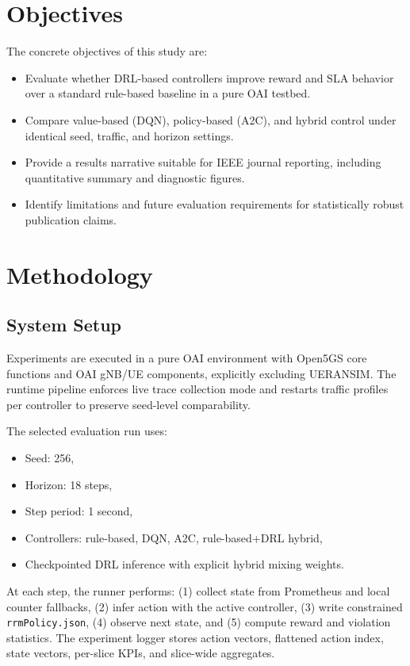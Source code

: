 \documentclass[journal]{IEEEtran}
\begin{document}
\section{Objectives}
The concrete objectives of this study are:
\begin{itemize}
    \item Evaluate whether DRL-based controllers improve reward and SLA behavior over a standard rule-based baseline in a pure OAI testbed.
    \item Compare value-based (DQN), policy-based (A2C), and hybrid control under identical seed, traffic, and horizon settings.
    \item Provide a results narrative suitable for IEEE journal reporting, including quantitative summary and diagnostic figures.
    \item Identify limitations and future evaluation requirements for statistically robust publication claims.
\end{itemize}

\section{Methodology}
\subsection{System Setup}
Experiments are executed in a pure OAI environment with Open5GS core functions and OAI gNB/UE components, explicitly excluding UERANSIM. The runtime pipeline enforces live trace collection mode and restarts traffic profiles per controller to preserve seed-level comparability.

The selected evaluation run uses:
\begin{itemize}
    \item Seed: 256,
    \item Horizon: 18 steps,
    \item Step period: 1 second,
    \item Controllers: rule-based, DQN, A2C, rule-based+DRL hybrid,
    \item Checkpointed DRL inference with explicit hybrid mixing weights.
\end{itemize}

At each step, the runner performs: (1) collect state from Prometheus and local counter fallbacks, (2) infer action with the active controller, (3) write constrained \texttt{rrmPolicy.json}, (4) observe next state, and (5) compute reward and violation statistics. The experiment logger stores action vectors, flattened action index, state vectors, per-slice KPIs, and slice-wide aggregates.
\end{document}
